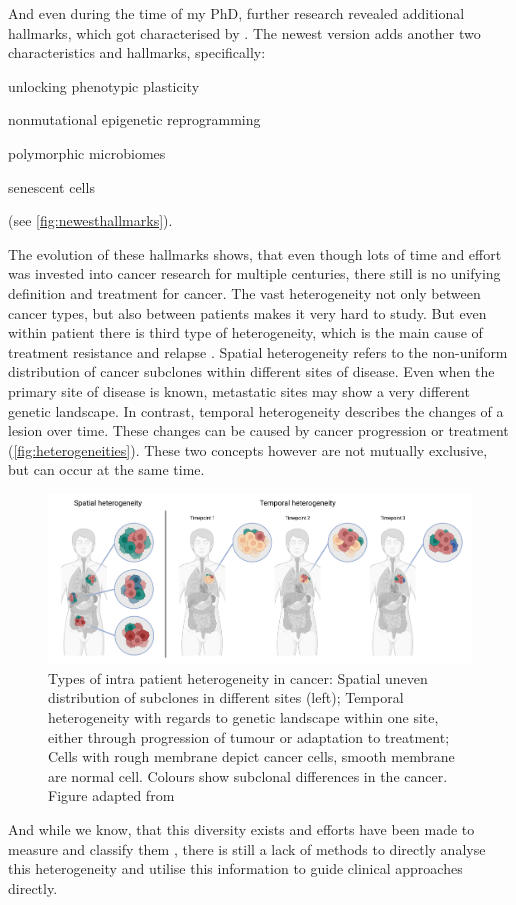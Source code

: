And even during the time of my PhD, further research revealed additional hallmarks, which got characterised by \textcite{Hanahan2022}. The newest version adds another two characteristics and hallmarks, specifically:
\begin{enumerate*}
\item unlocking phenotypic plasticity 
\item nonmutational epigenetic reprogramming
\item polymorphic microbiomes
\item senescent cells
\end{enumerate*} 
(see \autoref{fig:newesthallmarks}).

The evolution of these hallmarks shows, that even though lots of time and effort was invested into cancer research for multiple centuries, there still is no unifying definition and treatment for cancer. The vast heterogeneity not only between cancer types, but also between patients makes it very hard to study. But even within patient there is third type of heterogeneity, which is the main cause of treatment resistance and relapse \cite{DagogoJack2017}. Spatial heterogeneity refers to the non-uniform distribution of cancer subclones within different sites of disease. Even when the primary site of disease is known, metastatic sites may show a very different genetic landscape. In contrast, temporal heterogeneity describes the changes of a lesion over time. These changes can be caused by cancer progression or treatment (\autoref{fig:heterogeneities}). These two concepts however are not mutually exclusive, but can occur at the same time.

\begin{figure}[ht]
\centering
\includegraphics[width=.95\linewidth]{Figures/intro/heterogeneities.pdf}
\caption[Intra patient heterogeneities in cancer]{Types of intra patient heterogeneity in cancer: Spatial uneven distribution of subclones in different sites (left); Temporal heterogeneity with regards to genetic landscape within one site, either through progression of tumour or adaptation to treatment; Cells with rough membrane depict cancer cells, smooth membrane are normal cell. Colours show subclonal differences in the cancer. Figure adapted from \protect\textcite{DagogoJack2017}}\label{fig:heterogeneities}
\end{figure}


And while we know, that this diversity exists and efforts have been made to measure and classify them \cite{Noorbakhsh2018}, there is still a lack of methods to directly analyse this heterogeneity and utilise this information to guide clinical approaches directly.

